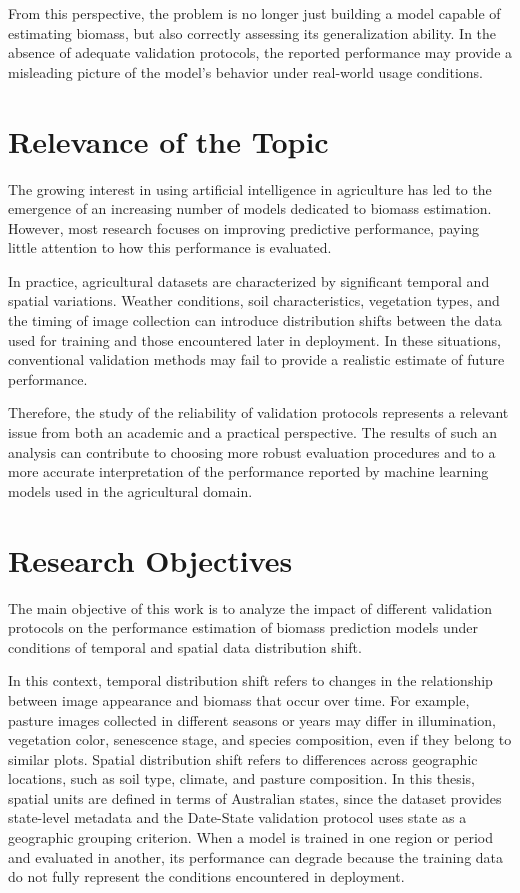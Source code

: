 From this perspective, the problem is no longer just building a model capable of estimating biomass, but also correctly assessing its generalization ability. In the absence of adequate validation protocols, the reported performance may provide a misleading picture of the model's behavior under real-world usage conditions.

\section{Relevance of the Topic}

The growing interest in using artificial intelligence in agriculture has led to the emergence of an increasing number of models dedicated to biomass estimation. However, most research focuses on improving predictive performance, paying little attention to how this performance is evaluated.

In practice, agricultural datasets are characterized by significant temporal and spatial variations. Weather conditions, soil characteristics, vegetation types, and the timing of image collection can introduce distribution shifts between the data used for training and those encountered later in deployment. In these situations, conventional validation methods may fail to provide a realistic estimate of future performance.

Therefore, the study of the reliability of validation protocols represents a relevant issue from both an academic and a practical perspective. The results of such an analysis can contribute to choosing more robust evaluation procedures and to a more accurate interpretation of the performance reported by machine learning models used in the agricultural domain.

\section{Research Objectives}

The main objective of this work is to analyze the impact of different validation protocols on the performance estimation of biomass prediction models under conditions of temporal and spatial data distribution shift.

In this context, temporal distribution shift refers to changes in the relationship between image appearance and biomass that occur over time. For example, pasture images collected in different seasons or years may differ in illumination, vegetation color, senescence stage, and species composition, even if they belong to similar plots. Spatial distribution shift refers to differences across geographic locations, such as soil type, climate, and pasture composition. In this thesis, spatial units are defined in terms of Australian states, since the dataset provides state-level metadata and the Date-State validation protocol uses state as a geographic grouping criterion. When a model is trained in one region or period and evaluated in another, its performance can degrade because the training data do not fully represent the conditions encountered in deployment.

